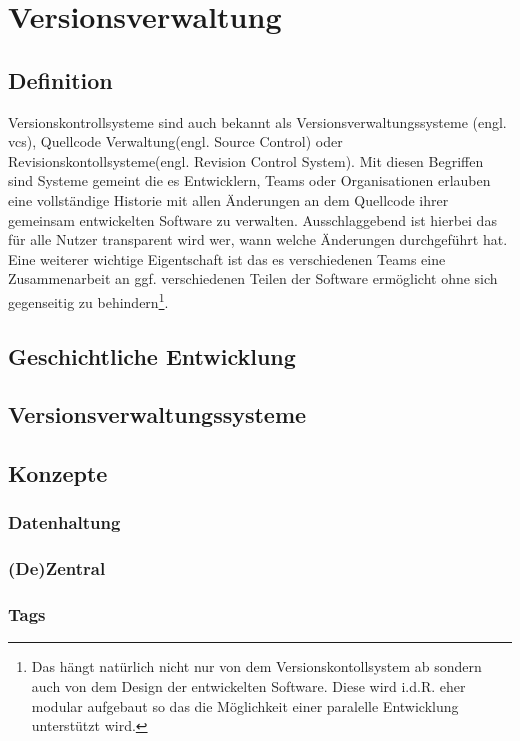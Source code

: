 \chapter{Versionsverwaltung}
\label{cha:Versionsverwaltung}
\section{Definition}
\label{sec:Definition}
Versionskontrollsysteme sind auch bekannt als Versionsverwaltungssysteme (engl.
\acrlong{vcs}), Quellcode Verwaltung(engl. Source Control) oder
Revisionskontollsysteme(engl. Revision Control System). Mit diesen Begriffen
sind Systeme gemeint die es Entwicklern, Teams oder Organisationen erlauben
eine vollständige Historie mit allen Änderungen an dem Quellcode ihrer
gemeinsam entwickelten Software zu verwalten. Ausschlaggebend ist hierbei das
für alle Nutzer transparent wird wer, wann welche Änderungen durchgeführt hat.
Eine weiterer wichtige Eigentschaft ist das es verschiedenen Teams eine
Zusammenarbeit an ggf. verschiedenen Teilen der Software ermöglicht ohne sich
gegenseitig zu behindern\footnote{\label{dev:1}Das hängt natürlich nicht nur von dem
Versionskontollsystem ab sondern auch von dem Design der entwickelten Software.
Diese wird i.d.R. eher modular aufgebaut so das die Möglichkeit einer paralelle
Entwicklung unterstützt wird.}.\cite[s.~381]{cd} 
\section{Geschichtliche Entwicklung}
\label{sec:GeschichtlicheEntwicklung}
\section{Versionsverwaltungssysteme}
\label{sec:systems}
\section{Konzepte}
\label{sec:Konzepte}
\subsection{Datenhaltung}
\label{sec:Datenhaltung}
\subsection{(De)Zentral}
\label{sec:dezentral}
\subsection{Tags}
\label{sec:Tags}
